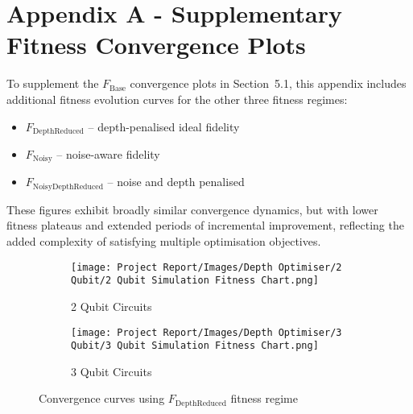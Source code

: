 \documentclass[11pt,a4paper]{article}
\begin{document}
%
%
\printbibliography

%
%
\newpage
\appendix
\section*{Appendix A - Supplementary Fitness Convergence Plots}
\label{appendix:fitness-convergence}
To supplement the $F_{\mathrm{Base}}$ convergence plots in Section~5.1, this appendix includes additional fitness evolution curves for the other three fitness regimes:

\begin{itemize}
    \item $F_{\mathrm{DepthReduced}}$ – depth-penalised ideal fidelity
    \item $F_{\mathrm{Noisy}}$ – noise-aware fidelity
    \item $F_{\mathrm{NoisyDepthReduced}}$ – noise and depth penalised
\end{itemize}

These figures exhibit broadly similar convergence dynamics, but with lower fitness plateaus and extended periods of incremental improvement, reflecting the added complexity of satisfying multiple optimisation objectives.

\begin{figure}[H]
    \centering
    \begin{subfigure}{.5\textwidth}
        \centering
        \texttt{[image: Project Report/Images/Depth Optimiser/2 Qubit/2 Qubit Simulation Fitness Chart.png]}
        \caption{2 Qubit Circuits}
        \label{fig:depth_fitness_2q}
    \end{subfigure}%
    \begin{subfigure}{.5\textwidth}
        \centering
        \texttt{[image: Project Report/Images/Depth Optimiser/3 Qubit/3 Qubit Simulation Fitness Chart.png]}
        \caption{3 Qubit Circuits}
        \label{fig:depth_fitness_3q}
    \end{subfigure}
    \caption{Convergence curves using $F_{\mathrm{DepthReduced}}$ fitness regime}
    \label{fig:depth_fitness_charts}
\end{figure}
\end{document}
